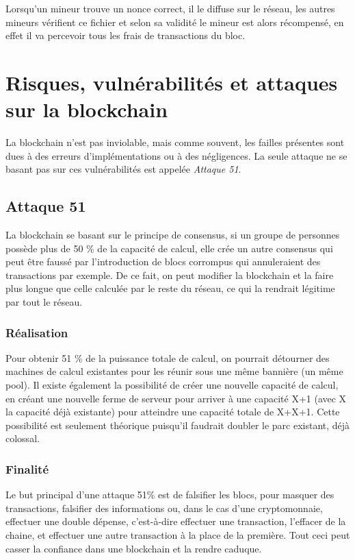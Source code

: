 \documentclass[12pt, a4paper, oneside]{book}
\begin{document}
    Lorsqu’un mineur trouve un nonce correct, il le diffuse sur le réseau, les autres mineurs vérifient ce fichier et selon sa validité le mineur est alors récompensé, en effet il va percevoir tous les frais de transactions du bloc.

    \chapter{Risques, vulnérabilités et attaques sur la blockchain}
    La blockchain n'est pas inviolable, mais comme souvent, les failles présentes sont dues à des erreurs d'implémentations ou à des négligences. La seule attaque ne se basant pas sur ces vulnérabilités est appelée \emph{Attaque 51}.
    \section{Attaque 51}
    La blockchain se basant sur le principe de consensus, si un groupe de personnes possède plus de 50 \% de la capacité de calcul, elle crée un autre consensus qui peut être faussé par l'introduction de blocs corrompus qui annuleraient des transactions par exemple. De ce fait, on peut modifier la blockchain et la faire plus longue que celle calculée par le reste du réseau, ce qui la rendrait légitime par tout le réseau.
    \subsection{Réalisation}
    Pour obtenir 51 \% de la puissance totale de calcul, on pourrait détourner des machines de calcul existantes pour les réunir sous une même bannière (un même pool).
    Il existe également la possibilité de créer une nouvelle capacité de calcul, en créant une nouvelle ferme de serveur pour arriver à une capacité X+1 (avec X la capacité déjà existante) pour atteindre une capacité totale de X+X+1. Cette possibilité est seulement théorique puisqu'il faudrait doubler le parc existant, déjà colossal.
    \subsection{Finalité}
    Le but principal d'une attaque 51\% est de falsifier les blocs, pour masquer des transactions, falsifier des informations ou, dans le cas d'une cryptomonnaie, effectuer une double dépense, c'est-à-dire effectuer une transaction, l'effacer de la chaine, et effectuer une autre transaction à la place de la première.
    \newline
    Tout ceci peut casser la confiance dans une blockchain et la rendre caduque.
\end{document}

